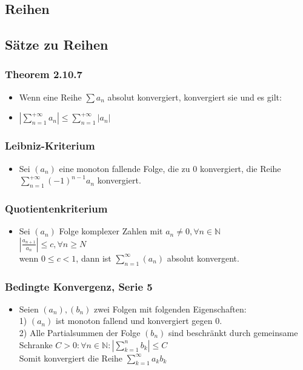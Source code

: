 \documentclass[a3paper, 11pt, landscape]{scrartcl}
\begin{document}
\begin{multicols*}{3}
		\section{Reihen}
		\subsection{Sätze zu Reihen}
		\subsubsection{Theorem 2.10.7}
		\begin{itemize}
		    \item Wenn eine Reihe $\sum a_n$ absolut konvergiert, konvergiert sie und es gilt:
		    \item $\left|\sum_{n=1}^{+\infty} a_{n}\right| \leqslant \sum_{n=1}^{+\infty}\left|a_{n}\right|$
		\end{itemize}
		\subsubsection{Leibniz-Kriterium}
		\begin{itemize}
		    \item Sei $(a_n)$ eine monoton fallende Folge, die zu $0$ konvergiert, die Reihe $\sum_{n=1}^{+\infty}(-1)^{n-1} a_{n}$ konvergiert.
		\end{itemize}
		\subsubsection{Quotientenkriterium}
		\begin{itemize}
		    \item Sei $(a_n)$ Folge komplexer Zahlen mit $a_n\neq 0, \forall n\in\mathbb{N}$\\
		    $| \frac{a_{n+1}}{a_n}|\leq c, \forall n \geq N$\\
		    wenn $0\leq c < 1$, dann ist $\sum_{n=1}^\infty (a_n)$ absolut konvergent.
		\end{itemize}
		\subsubsection{Bedingte Konvergenz, Serie 5}
		\begin{itemize}
		    \item Seien $(a_n),(b_n)$ zwei Folgen mit folgenden Eigenschaften:\\
		    1) $(a_n)$ ist monoton fallend und konvergiert gegen 0.\\
		    2) Alle Partialsummen der Folge $(b_n)$ sind beschränkt durch gemeinsame Schranke $C>0: \forall n \in \mathbb{N}: | \sum_{k=1}^n b_k |\leq C$\\
		    Somit konvergiert die Reihe $\sum_{k=1}^\infty a_k b_k$
		\end{itemize}

\end{multicols*}
\end{document}
